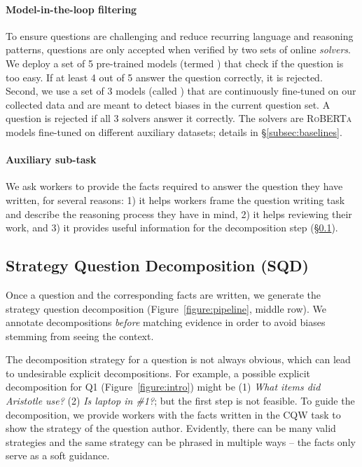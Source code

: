 {\paragraph{Model-in-the-loop filtering}
To ensure questions are challenging and reduce recurring language and reasoning patterns, questions are only accepted when verified by two sets of online \emph{solvers}. We deploy a set of 5 pre-trained models (termed \ckptzero{}) that check if the question is too easy. If at least 4 out of 5 answer the question correctly, it is rejected. 
Second, we use a set of 3 models (called \fntd{}) that are continuously fine-tuned on our collected data and are meant to detect biases in the current question set. 
A question is rejected if all 3 solvers answer it correctly. 
The solvers are \textsc{RoBERTa} \cite{liu2019roberta} models fine-tuned on different auxiliary datasets; details in \S\ref{subsec:baselines}.

\paragraph{Auxiliary sub-task} We ask workers to provide the facts required to answer the question they have written,  
for several reasons: 1) it helps workers frame the question writing task and describe the reasoning process they have in mind, 2) it helps reviewing their work, and 3) it provides useful information for the decomposition step (\S\ref{subsection:sqd}).

\subsection{Strategy Question Decomposition (SQD)}
\label{subsection:sqd}

Once a question and the corresponding facts are written, we generate the strategy question decomposition (Figure~\ref{figure:pipeline}, middle row). 
We annotate decompositions \emph{before} matching evidence in order to avoid biases stemming from seeing the context.

The decomposition strategy for a question is not always obvious, which can lead to undesirable explicit decompositions. For example, a possible explicit decomposition for Q1 (Figure~\ref{figure:intro}) might be (1) \textit{What items did Aristotle use?} (2) \textit{Is laptop in \#1?}; but the first step is not feasible.
To guide the decomposition, we provide workers with the facts written in the CQW task to show the strategy of the question author. Evidently, there can be many valid strategies and the same strategy can be phrased in multiple ways -- the facts only serve as a soft guidance. 

}
